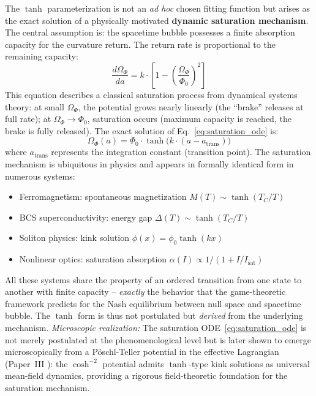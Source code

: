 \documentclass[aps,prd,twocolumn,superscriptaddress,nofootinbib]{revtex4-2}
\begin{document}
The $\tanh$ parameterization is not an \textit{ad hoc} chosen fitting function but arises as the exact solution of a physically motivated \textbf{dynamic saturation mechanism}. The central assumption is: the spacetime bubble possesses a finite absorption capacity for the curvature return. The return rate is proportional to the remaining capacity:
\begin{equation}
\frac{d\Omega_\Phi}{da} = k \cdot \left[1 - \left(\frac{\Omega_\Phi}{\Phi_0}\right)^{\!2}\right]
\label{eq:saturation_ode}
\end{equation}
This equation describes a classical saturation process from dynamical systems theory: at small $\Omega_\Phi$, the potential grows nearly linearly (the ``brake'' releases at full rate); at $\Omega_\Phi \to \Phi_0$, saturation occurs (maximum capacity is reached, the brake is fully released). The exact solution of Eq.~\eqref{eq:saturation_ode} is:
\begin{equation}
\Omega_\Phi(a) = \Phi_0 \cdot \tanh\!\big(k\cdot(a - a_{\mathrm{trans}})\big)
\end{equation}
where $a_{\mathrm{trans}}$ represents the integration constant (transition point). The saturation mechanism is ubiquitous in physics and appears in formally identical form in numerous systems:
\begin{itemize}
\item Ferromagnetism: spontaneous magnetization $M(T) \sim \tanh(T_C/T)$
\item BCS superconductivity: energy gap $\Delta(T) \sim \tanh(T_C/T)$
\item Soliton physics: kink solution $\phi(x) = \phi_0 \tanh(kx)$
\item Nonlinear optics: saturation absorption $\alpha(I) \propto 1/(1 + I/I_{\mathrm{sat}})$
\end{itemize}
All these systems share the property of an ordered transition from one state to another with finite capacity -- \textit{exactly} the behavior that the game-theoretic framework predicts for the Nash equilibrium between null space and spacetime bubble. The $\tanh$ form is thus not postulated but \textit{derived} from the underlying mechanism. \textit{Microscopic realization:} The saturation ODE~\eqref{eq:saturation_ode} is not merely postulated at the phenomenological level but is later shown to emerge microscopically from a P\"oschl-Teller potential in the effective Lagrangian (Paper~III \cite{Geiger2026c}): the $\cosh^{-2}$ potential admits $\tanh$-type kink solutions as universal mean-field dynamics, providing a rigorous field-theoretic foundation for the saturation mechanism.
\end{document}
